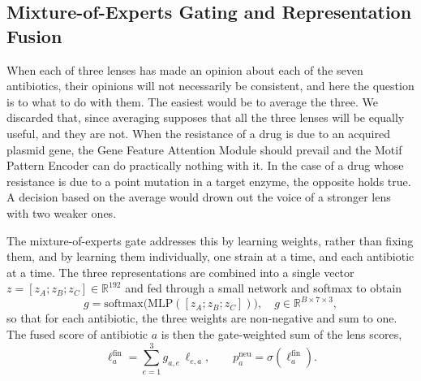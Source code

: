\documentclass[journal]{IEEEtran}
\begin{document}
\subsection{Mixture-of-Experts Gating and Representation Fusion}
\label{subsec:moegate}

When each of three lenses has made an opinion about each of the seven antibiotics,
their opinions will not necessarily be consistent, and here the question is to what
to do with them. The easiest would be to average the three. We discarded that, since
averaging supposes that all the three lenses will be equally useful, and they are
not. When the resistance of a drug is due to an acquired plasmid gene, the Gene
Feature Attention Module should prevail and the Motif Pattern Encoder can do
practically nothing with it. In the case of a drug whose resistance is due to a point
mutation in a target enzyme, the opposite holds true. A decision based on the average
would drown out the voice of a stronger lens with two weaker ones.

The mixture-of-experts gate \cite{jacobs1991moe, shazeer2017moe} addresses this by
learning weights, rather than fixing them, and by learning them individually, one
strain at a time, and each antibiotic at a time. The three representations are
combined into a single vector $z = [z_A; z_B; z_C] \in \mathbb{R}^{192}$ and fed
through a small network and softmax to obtain
\begin{equation}
g = \mathrm{softmax}\big(\mathrm{MLP}([z_A; z_B; z_C])\big), \quad g \in \mathbb{R}^{B \times 7 \times 3},
\label{eq:moe_gate}
\end{equation}
so that for each antibiotic, the three weights are non-negative and sum to one. The
fused score of antibiotic $a$ is then the gate-weighted sum of the lens scores,
\begin{equation}
\ell^{\mathrm{fin}}_{a} = \sum_{e=1}^{3} g_{a,e}\,\ell_{e,a},
\qquad
p^{\mathrm{neu}}_{a} = \sigma\!\left(\ell^{\mathrm{fin}}_{a}\right).
\label{eq:fusion}
\end{equation}
\end{document}
